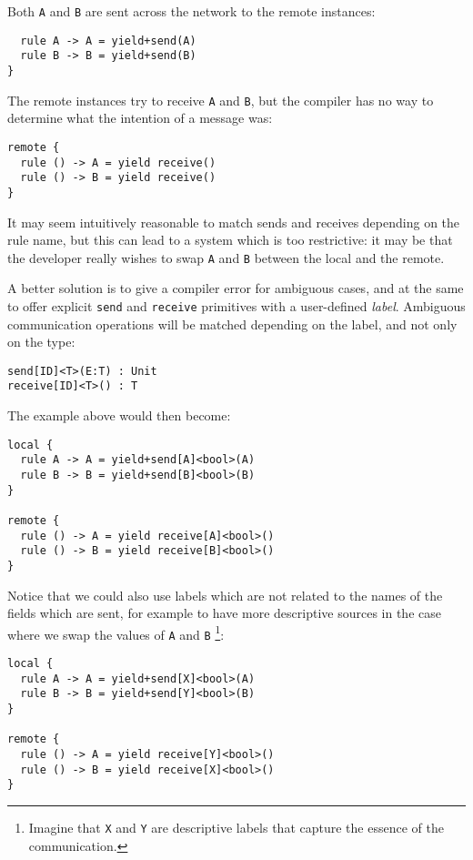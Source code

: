 Both \texttt{A} and \texttt{B} are sent across the network to the remote instances:

\begin{lstlisting}
  rule A -> A = yield+send(A)
  rule B -> B = yield+send(B)
}
\end{lstlisting}

The remote instances try to receive \texttt{A} and \texttt{B}, but the compiler has no way to determine what the intention of a message was:

\begin{lstlisting}
remote {
  rule () -> A = yield receive()
  rule () -> B = yield receive()
}
\end{lstlisting}

It may seem intuitively reasonable to match sends and receives depending on the rule name, but this can lead to a system which is too restrictive: it may be that the developer really wishes to swap \texttt{A} and \texttt{B} between the local and the remote.

A better solution is to give a compiler error for ambiguous cases, and at the same to offer explicit \texttt{send} and \texttt{receive} primitives with a user-defined \textit{label}. Ambiguous communication operations will be matched depending on the label, and not only on the type:

\begin{lstlisting}
send[ID]<T>(E:T) : Unit
receive[ID]<T>() : T
\end{lstlisting}

The example above would then become:

\begin{lstlisting}
local {
  rule A -> A = yield+send[A]<bool>(A)
  rule B -> B = yield+send[B]<bool>(B)
}

remote {
  rule () -> A = yield receive[A]<bool>()
  rule () -> B = yield receive[B]<bool>()
}
\end{lstlisting}

Notice that we could also use labels which are not related to the names of the fields which are sent, for example to have more descriptive sources in the case where we swap the values of \texttt{A} and \texttt{B} \footnote{Imagine that \texttt{X} and \texttt{Y} are descriptive labels that capture the essence of the communication.}:

\begin{lstlisting}
local {
  rule A -> A = yield+send[X]<bool>(A)
  rule B -> B = yield+send[Y]<bool>(B)
}

remote {
  rule () -> A = yield receive[Y]<bool>()
  rule () -> B = yield receive[X]<bool>()
}
\end{lstlisting}

